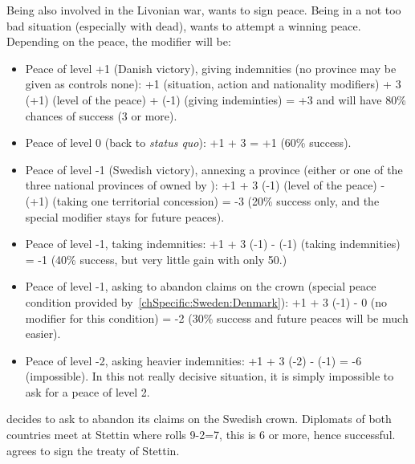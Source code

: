\begin{exemple}
  Being also involved in the Livonian war, \SUE wants to sign peace. Being in
  a not too bad situation (especially with  dead), \SUE
  wants to attempt a winning peace. Depending on the peace, the modifier will
  be:
  \begin{itemize}
  \item Peace of level +1 (Danish victory), giving indemnities (no province
    may be given as \paysDanemark controls none): +1 (situation, action and
    nationality modifiers) + 3 \textmultiply (+1) (level of the peace) + (-1)
    (giving indeminties) = +3 and will have 80\% chances of success (3 or
    more).
  \item Peace of level 0 (back to \emph{status quo}): +1 + 3 
    = +1 (60\% success).
  \item Peace of level -1 (Swedish victory), annexing a province (either
    \provinceTrondelag or one of the three national provinces of \SUE owned by
    \paysDanemark): +1 + 3 \textmultiply (-1) (level of the peace) - (+1)
    (taking one territorial concession) = -3 (20\% success only, and the
    special modifier stays for future peaces).
  \item Peace of level -1, taking indemnities: +1 + 3 \textmultiply (-1) -
    (-1) (taking indemnities) = -1 (40\% success, but very little gain with
    only 50\ducats.)
  \item Peace of level -1, asking \paysDanemark to abandon claims on the crown
    (special peace condition provided by~\ref{chSpecific:Sweden:Denmark}): +1
    + 3 \textmultiply (-1) - 0 (no modifier for this condition) = -2 (30\%
    success and future peaces will be much easier).
  \item Peace of level -2, asking heavier indemnities: +1 + 3 \textmultiply
    (-2) - (-1) = -6 (impossible). In this not really decisive situation, it
    is simply impossible to ask for a peace of level 2.
  \end{itemize}

  \SUE decides to ask \paysDanemark to abandon its claims on the Swedish
  crown. Diplomats of both countries meet at Stettin where \SUE rolls 9-2=7,
  this is 6 or more, hence successful. \paysDanemark agrees to sign the treaty
  of Stettin.
\end{exemple}

